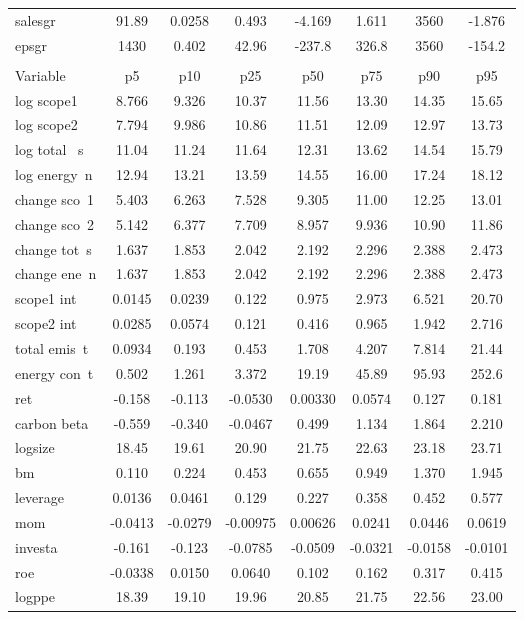 \documentclass[]{article}
\begin{document}
\begin{tabular}{lccccccc}
salesgr & 91.89 & 0.0258 & 0.493 & -4.169 & 1.611 & 3560 & -1.876 \\
epsgr & 1430 & 0.402 & 42.96 & -237.8 & 326.8 & 3560 & -154.2 \\
 &  &  &  &  &  &  &  \\
Variable & p5 & p10 & p25 & p50 & p75 & p90 & p95 \\
log scope1 & 8.766 & 9.326 & 10.37 & 11.56 & 13.30 & 14.35 & 15.65 \\
log scope2 & 7.794 & 9.986 & 10.86 & 11.51 & 12.09 & 12.97 & 13.73 \\
log total ~s & 11.04 & 11.24 & 11.64 & 12.31 & 13.62 & 14.54 & 15.79 \\
log energy~n & 12.94 & 13.21 & 13.59 & 14.55 & 16.00 & 17.24 & 18.12 \\
change sco~1 & 5.403 & 6.263 & 7.528 & 9.305 & 11.00 & 12.25 & 13.01 \\
change sco~2 & 5.142 & 6.377 & 7.709 & 8.957 & 9.936 & 10.90 & 11.86 \\
change tot~s & 1.637 & 1.853 & 2.042 & 2.192 & 2.296 & 2.388 & 2.473 \\
change ene~n & 1.637 & 1.853 & 2.042 & 2.192 & 2.296 & 2.388 & 2.473 \\
scope1 int & 0.0145 & 0.0239 & 0.122 & 0.975 & 2.973 & 6.521 & 20.70 \\
scope2 int & 0.0285 & 0.0574 & 0.121 & 0.416 & 0.965 & 1.942 & 2.716 \\
total emis~t & 0.0934 & 0.193 & 0.453 & 1.708 & 4.207 & 7.814 & 21.44 \\
energy con~t & 0.502 & 1.261 & 3.372 & 19.19 & 45.89 & 95.93 & 252.6 \\
ret & -0.158 & -0.113 & -0.0530 & 0.00330 & 0.0574 & 0.127 & 0.181 \\
carbon beta & -0.559 & -0.340 & -0.0467 & 0.499 & 1.134 & 1.864 & 2.210 \\
logsize & 18.45 & 19.61 & 20.90 & 21.75 & 22.63 & 23.18 & 23.71 \\
bm & 0.110 & 0.224 & 0.453 & 0.655 & 0.949 & 1.370 & 1.945 \\
leverage & 0.0136 & 0.0461 & 0.129 & 0.227 & 0.358 & 0.452 & 0.577 \\
mom & -0.0413 & -0.0279 & -0.00975 & 0.00626 & 0.0241 & 0.0446 & 0.0619 \\
investa & -0.161 & -0.123 & -0.0785 & -0.0509 & -0.0321 & -0.0158 & -0.0101 \\
roe & -0.0338 & 0.0150 & 0.0640 & 0.102 & 0.162 & 0.317 & 0.415 \\
logppe & 18.39 & 19.10 & 19.96 & 20.85 & 21.75 & 22.56 & 23.00 \\

\end{tabular}
\end{document}
